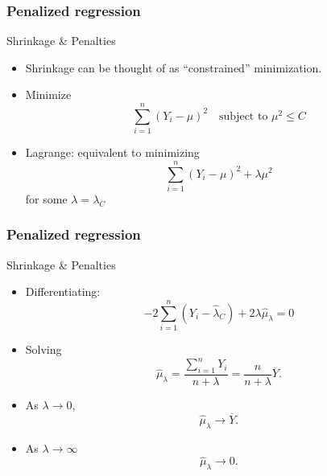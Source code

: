 \documentclass[handout]{beamer}
\newcommand{\Ybar}{\overline{Y}}
\begin{document}
   \begin{frame} \frametitle{Penalized regression}

   \begin{block}
     {Shrinkage \& Penalties}
     \begin{itemize}
     \item Shrinkage can be thought of as ``constrained'' minimization.

     \item Minimize
   $$
   \sum_{i=1}^n (Y_i - \mu)^2 \quad \text{subject to $\mu^2 \leq C$} $$

   \item Lagrange: equivalent to minimizing
   $$
   \sum_{i=1}^n (Y_i - \mu)^2 + \lambda \mu^2$$
   for some $\lambda=\lambda_C$
     \end{itemize}

   \end{block}
   \end{frame}


   \begin{frame} \frametitle{Penalized regression}

   \begin{block}
     {Shrinkage \& Penalties}
     \begin{itemize}
   \item Differentiating:
   $$- 2 \sum_{i=1}^n (Y_i - \widehat{\lambda}_C) + 2 \lambda \widehat{\mu}_{\lambda} = 0$$

   \item Solving
   $$
   \widehat{\mu}_{\lambda} = \frac{\sum_{i=1}^n Y_i}{n + \lambda} = \frac{n}{n+\lambda} \overline{Y}.$$
     \item As
   $\lambda \rightarrow 0$,
   $$
   \widehat{\mu}_{\lambda} \rightarrow \Ybar.$$

   \item As $\lambda \rightarrow \infty$
   $$
   \widehat{\mu}_{\lambda} \rightarrow 0.$$

     \end{itemize}

   \end{block}
   \end{frame}

\end{document}
